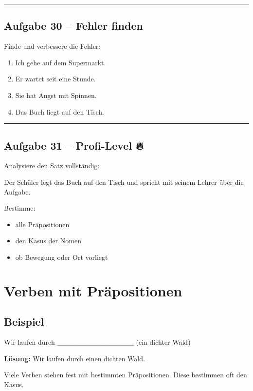 \documentclass[a4paper,12pt]{article}
\newcommand{\linie}{\vspace{4pt}\hrule\vspace{10pt}}
\begin{document}
\linie

\subsection*{Aufgabe 30 – Fehler finden}

Finde und verbessere die Fehler:

\begin{enumerate}
\item Ich gehe auf dem Supermarkt.
\item Er wartet seit eine Stunde.
\item Sie hat Angst mit Spinnen.
\item Das Buch liegt auf den Tisch.
\end{enumerate}

\linie

\subsection*{Aufgabe 31 – Profi-Level 🔥}

Analysiere den Satz vollständig:

Der Schüler legt das Buch auf den Tisch und spricht mit seinem Lehrer über die Aufgabe.

Bestimme:
\begin{itemize}
\item alle Präpositionen
\item den Kasus der Nomen
\item ob Bewegung oder Ort vorliegt
\end{itemize}

\newpage
\section*{Verben mit Präpositionen}

\subsection*{Beispiel}

Wir laufen durch \_\_\_\_\_\_\_\_\_\_\_\_\_\_\_ (ein dichter Wald)

\textbf{Lösung:}  
Wir laufen durch einen dichten Wald.

\begin{merksatz}
Viele Verben stehen fest mit bestimmten Präpositionen.  
Diese bestimmen oft den Kasus.
\end{merksatz}
\end{document}
